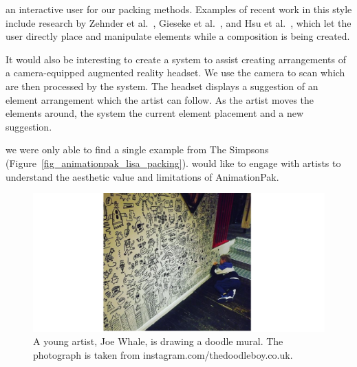  an interactive user  for our packing methods.
Examples of recent work in this style include research
by Zehnder et al.~\cite{Zehnder2016}, Gieseke et al.~\cite{Gieseke2017}, 
and Hsu et al.~\cite{Hsu2020}, which let the user directly place and manipulate
elements while a composition is being created.


It would also be interesting to create a system to assist  creating arrangements of  a camera-equipped augmented reality headset. 
We use the camera to scan  which are then processed by the system.
The headset displays a suggestion of an element arrangement which the artist can follow.
As the artist moves the elements around, the system  the current element placement and  a new suggestion.

we were only able to find a single example from The Simpsons (Figure~\ref{fig_animationpak_lisa_packing}). 
 would like to engage with artists to understand the aesthetic value and limitations
of AnimationPak.

\begin{figure}
\centering
\includegraphics[width=1.0\textwidth]{figures/conclusions/doodle_boy.pdf}
\caption[A doodle mural by Joe Whale]
{ \label{doodle_boy} 
\newtext
{
A young artist, Joe Whale, is drawing a doodle mural. 
The photograph is taken from instagram.com/thedoodleboy.co.uk.
}
}
\end{figure}

